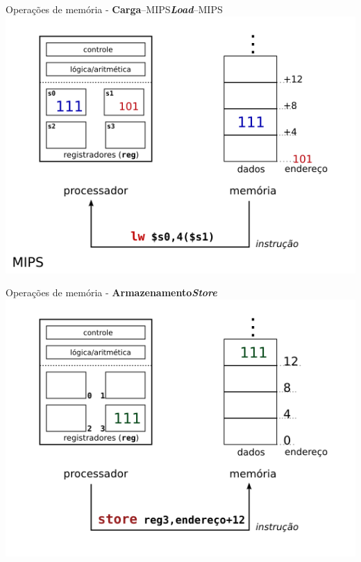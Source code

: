 \begin{frame}{Operações de memória - {\bf Carga}--MIPS}{{\em\bf Load}--MIPS}
\includegraphics[scale=0.7]{instr_mem_load_mips.png}
\end{frame}

\begin{frame}{Operações de memória - {\bf Armazenamento}}{{\em\bf Store}}
\includegraphics[scale=0.7]{instr_mem_store.png}
\end{frame}

